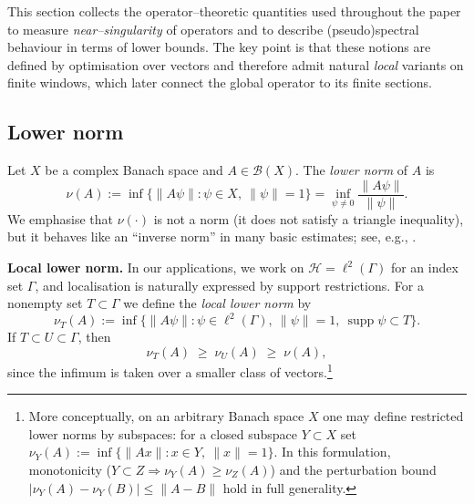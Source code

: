 \documentclass[11pt]{article}
\theoremstyle{definition}
\newcommand{\supp}{\operatorname{supp}}
\begin{document}
This section collects the operator--theoretic quantities used throughout the paper
to measure \emph{near--singularity} of operators and to describe (pseudo)spectral
behaviour in terms of lower bounds.  The key point is that these notions are
defined by optimisation over vectors and therefore admit natural \emph{local}
variants on finite windows, which later connect the global operator to its
finite sections.

\subsection{Lower norm}
\label{sec:lower-norms}

Let $X$ be a complex Banach space and $A\in\mathcal{B}(X)$.
The \emph{lower norm} of $A$ is
\begin{equation}\label{eq:lower-norm}
  \nu(A)
  := \inf\{\|A\psi\| : \psi\in X,\ \|\psi\|=1\}
  = \inf_{\psi\neq 0}\frac{\|A\psi\|}{\|\psi\|}.
\end{equation}
We emphasise that $\nu(\cdot)$ is not a norm (it does not satisfy a triangle
inequality), but it behaves like an ``inverse norm'' in many basic estimates;
see, e.g., \cite{Lindner2006}.

\medskip

\noindent
\textbf{Local lower norm.}
In our applications, we work on $\mathcal H=\ell^2(\Gamma)$ for an index set $\Gamma$, and
localisation is naturally expressed by support restrictions. For a nonempty set
$T\subset\Gamma$ we define the \emph{local lower norm} by
\begin{equation}\label{eq:local-lower-norm}
  \nu_T(A)
  := \inf\{\|A\psi\| : \psi\in \ell^2(\Gamma),\ \|\psi\|=1,\ \supp\psi\subset T\}.
\end{equation}
If $T\subset U\subset\Gamma$, then
\begin{equation}\label{eq:local-lower-norm-monotone}
  \nu_T(A)\;\ge\;\nu_U(A)\;\ge\;\nu(A),
\end{equation}
since the infimum is taken over a smaller class of vectors.\footnote{More conceptually, on an arbitrary Banach space $X$ one may define restricted lower norms by subspaces: for a closed subspace $Y\subset X$ set $\nu_Y(A):=\inf\{\|Ax\|:x\in Y,\ \|x\|=1\}$. In this formulation, monotonicity ($Y\subset Z\Rightarrow \nu_Y(A)\ge \nu_Z(A)$) and the perturbation bound $|\nu_Y(A)-\nu_Y(B)|\le\|A-B\|$ hold in full generality.}

\medskip
\end{document}
